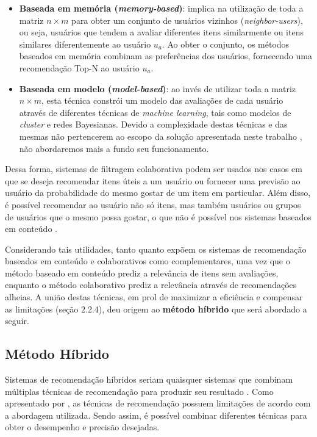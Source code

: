 \documentclass[12pt, openright, oneside, a4paper, brazil]{abntex2}
\begin{document}
\begin{itemize}
	\item \textbf{Baseada em memória (\textit{memory-based})}: implica na utilização de toda a matriz $n \times m$ para obter um conjunto de usuários vizinhos (\textit{neighbor-users}), ou seja, usuários que tendem a avaliar diferentes itens similarmente ou itens similares diferentemente ao usuário $u_{a}$. Ao obter o conjunto, os métodos baseados em memória combinam as preferências dos usuários, fornecendo uma recomendação Top-N ao usuário $u_{a}$.

	\item \textbf{Baseada em modelo (\textit{model-based})}: ao invés de utilizar toda a matriz $n \times m$, esta técnica constrói um modelo das avaliações de cada usuário através de diferentes técnicas de \textit{machine learning}, tais como modelos de \textit{cluster} e redes Bayesianas. Devido a complexidade destas técnicas e das mesmas não pertencerem ao escopo da solução apresentada neste trabalho , não abordaremos mais a fundo seu funcionamento.
\end{itemize}

Dessa forma, sistemas de filtragem colaborativa podem ser usados nos casos em que se deseja recomendar itens úteis a um usuário ou fornecer uma previsão ao usuário da probabilidade do mesmo gostar de um item em particular. Além disso, é possível recomendar ao usuário não só itens, mas também usuários ou grupos de usuários que o mesmo possa gostar, o que não é possível nos sistemas baseados em conteúdo \cite{schafer2007collaborative}.

Considerando tais utilidades, tanto  quanto  expõem os sistemas de recomendação baseados em conteúdo e colaborativos como complementares, uma vez que o método baseado em conteúdo prediz a relevância de itens sem avaliações, enquanto o método colaborativo prediz a relevância através de recomendações alheias. A união destas técnicas, em prol de maximizar a eficiência e compensar as limitações (seção 2.2.4), deu origem ao \textbf{método híbrido} que será abordado a seguir.

\subsection{Método Híbrido}

Sistemas de recomendação híbridos seriam quaisquer sistemas que combinam múltiplas técnicas de recomendação para produzir seu resultado \cite{burke2002hybrid, burke2007hybrid}. Como apresentado por , as técnicas de recomendação possuem limitações de acordo com a abordagem utilizada. Sendo assim, é possível combinar diferentes técnicas para obter o desempenho e precisão desejadas.
\end{document}
